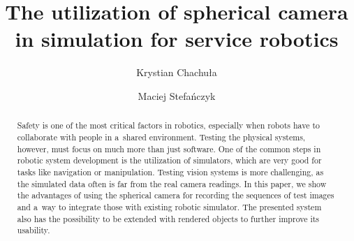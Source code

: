 \documentclass{svproc}
\begin{document}
\mainmatter





\title{The utilization of spherical camera in simulation for service robotics}

\author{Krystian Chachuła\inst{[0000-0001-5764-7348]} \and Maciej Stefańczyk\inst{[0000-0001-9948-6319]}}


\maketitle

\begin{abstract}

    Safety is one of the most critical factors in robotics, especially when robots have to 
    collaborate with people in a~shared environment. Testing the physical systems, however, must
    focus on much more than just software. One of the common steps in robotic system development
    is the utilization of simulators, which are very good for tasks like navigation or manipulation.
    Testing vision systems is more challenging, as the simulated data often is far from the
    real camera readings. In this paper, we show the advantages of using the spherical camera
    for recording the sequences of test images and a~way to integrate those with existing
    robotic simulator. The presented system also has the possibility to be extended with rendered
    objects to further improve its usability.


\end{abstract}
\end{document}

